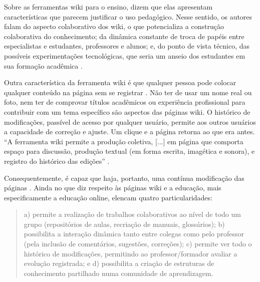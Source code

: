 \documentclass{textolivre}
\begin{document}
Sobre as ferramentas wiki para o ensino, \textcite[p. 78]{moraes2016} dizem que elas apresentam características que parecem justificar o uso pedagógico. Nesse sentido, os autores falam do aspecto colaborativo dos wiki, o que potencializa a construção colaborativa do conhecimento; da dinâmica constante de troca de papéis entre especialistas e estudantes, professores e alunos; e, do ponto de vista técnico, das possíveis experimentações tecnológicas, que seria um anseio dos estudantes em sua formação acadêmica %
\cites{cummings2009,ruth2009}[apud MORAES et. al., 2016, p.~78]{konieczny2007}.

Outra característica da ferramenta wiki é que qualquer pessoa pode colocar qualquer conteúdo na página sem se registrar \cite[p.~2]{suoranta2017}. Não ter de usar um nome real ou foto, nem ter de comprovar títulos acadêmicos ou experiência profissional para contribuir com um tema específico são aspectos das páginas wiki. O histórico de modificações, passível de acesso por qualquer usuário, permite aos outros usuários a capacidade de correção e ajuste. Um clique e a página retorna ao que era antes. “A ferramenta wiki permite a produção coletiva, [...] em página que comporta espaço para discussão, produção textual (em forma escrita, imagética e sonora), e registro do histórico das edições” \cite[p. 174]{gomes2011}. 

Consequentemente, é capaz que haja, portanto, uma contínua modificação das páginas \cite[p. 93]{zhang2009}.
Ainda no que diz respeito às páginas wiki e a educação, mais especificamente a educação online, \textcite[p. 69]{junior2017} elencam quatro particularidades:

\begin{quote}a) permite a realização de trabalhos colaborativos ao nível de todo um grupo (repositórios de aulas, recriação de manuais, glossários); b) possibilita a interação dinâmica tanto entre colegas como pelo professor (pela inclusão de comentários, sugestões, correções); c) permite ver todo o histórico de modificações, permitindo ao professor/formador avaliar a evolução registrada; e d) possibilita a criação de estruturas de conhecimento partilhado numa comunidade de aprendizagem.\end{quote}
\end{document}
